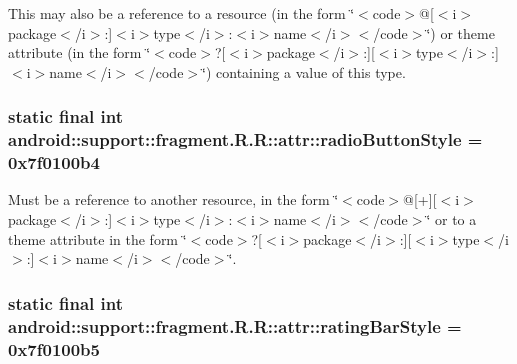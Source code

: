 This may also be a reference to a resource (in the form \char`\"{}$<$code$>$@\mbox{[}$<$i$>$package$<$/i$>$:\mbox{]}$<$i$>$type$<$/i$>$:$<$i$>$name$<$/i$>$$<$/code$>$\char`\"{}) or theme attribute (in the form \char`\"{}$<$code$>$?\mbox{[}$<$i$>$package$<$/i$>$:\mbox{]}\mbox{[}$<$i$>$type$<$/i$>$:\mbox{]}$<$i$>$name$<$/i$>$$<$/code$>$\char`\"{}) containing a value of this type. \hypertarget{classandroid_1_1support_1_1fragment_1_1_r_1_1attr_7e83009f497b0d8a8da06e5d26a4b1c1}{
\subsubsection[{radioButtonStyle}]{\setlength{\rightskip}{0pt plus 5cm}static final int android::support::fragment.R.R::attr::radioButtonStyle = 0x7f0100b4}}
\label{classandroid_1_1support_1_1fragment_1_1_r_1_1attr_7e83009f497b0d8a8da06e5d26a4b1c1}


Must be a reference to another resource, in the form \char`\"{}$<$code$>$@\mbox{[}+\mbox{]}\mbox{[}$<$i$>$package$<$/i$>$:\mbox{]}$<$i$>$type$<$/i$>$:$<$i$>$name$<$/i$>$$<$/code$>$\char`\"{} or to a theme attribute in the form \char`\"{}$<$code$>$?\mbox{[}$<$i$>$package$<$/i$>$:\mbox{]}\mbox{[}$<$i$>$type$<$/i$>$:\mbox{]}$<$i$>$name$<$/i$>$$<$/code$>$\char`\"{}. \hypertarget{classandroid_1_1support_1_1fragment_1_1_r_1_1attr_9e35703f6a4d659899032e1af290c08c}{
\subsubsection[{ratingBarStyle}]{\setlength{\rightskip}{0pt plus 5cm}static final int android::support::fragment.R.R::attr::ratingBarStyle = 0x7f0100b5}}
\label{classandroid_1_1support_1_1fragment_1_1_r_1_1attr_9e35703f6a4d659899032e1af290c08c}


